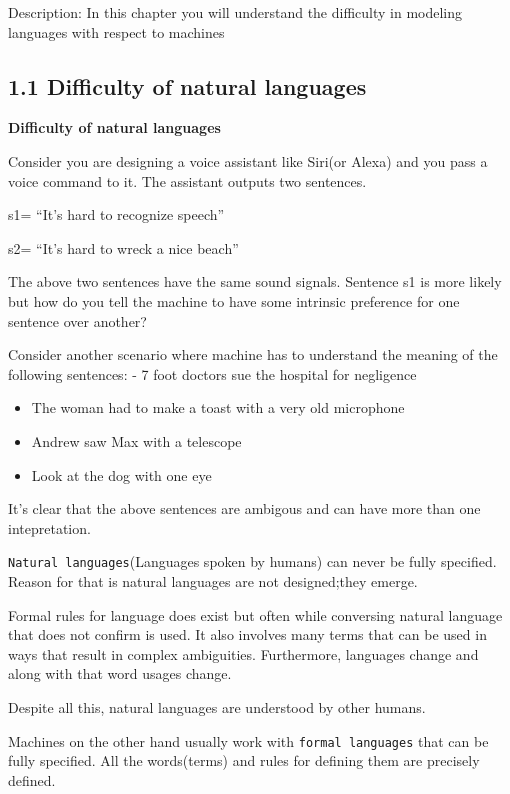 \documentclass[11pt]{article}
\begin{document}
Description: In this chapter you will understand the difficulty in
modeling languages with respect to machines

    \hypertarget{difficulty-of-natural-languages}{%
\subsection{1.1 Difficulty of natural
languages}\label{difficulty-of-natural-languages}}

    \textbf{Difficulty of natural languages}

Consider you are designing a voice assistant like Siri(or Alexa) and you
pass a voice command to it. The assistant outputs two sentences.

s1= ``It's hard to recognize speech''

s2= ``It's hard to wreck a nice beach''

The above two sentences have the same sound signals. Sentence s1 is more
likely but how do you tell the machine to have some intrinsic preference
for one sentence over another?

Consider another scenario where machine has to understand the meaning of
the following sentences: - 7 foot doctors sue the hospital for
negligence

\begin{itemize}
\item
  The woman had to make a toast with a very old microphone
\item
  Andrew saw Max with a telescope
\item
  Look at the dog with one eye
\end{itemize}

It's clear that the above sentences are ambigous and can have more than
one intepretation.

\texttt{Natural\ languages}(Languages spoken by humans) can never be
fully specified. Reason for that is natural languages are not
designed;they emerge.

Formal rules for language does exist but often while conversing natural
language that does not confirm is used. It also involves many terms that
can be used in ways that result in complex ambiguities. Furthermore,
languages change and along with that word usages change.

Despite all this, natural languages are understood by other humans.

Machines on the other hand usually work with \texttt{formal\ languages}
that can be fully specified. All the words(terms) and rules for defining
them are precisely defined.
\end{document}
